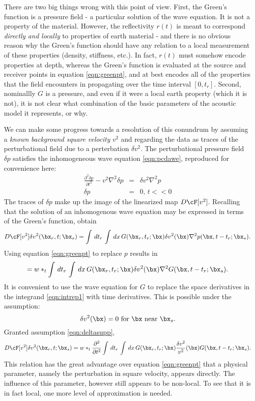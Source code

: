 There are two big things wrong with this point of view. First, the Green's function is a pressure field - a particular solution of the wave equation. It is not a property of the material. However, the reflectivity $r(t)$ is meant to correspond {\em directly and locally}  to properties of earth material - and there is no obvious reason why the Green's function should have any relation to a local measurement of these properties (density, stiffness, etc.). In fact, $r(t)$ must somehow encode properties at depth, whereas the Green's function is evaluated at the source and receiver points in equation \ref{eqn:greenpt}, and at best encodes all of the properties that the field encounters in propagating over the time interval $[0,t_r]$. Second, nominallly $G$ is a pressure, and even if it were a local earth property (which it is not), it is not clear what combination of the basic parameters of the acoustic model it represents, or why.

We can make some progress towards a resolution of this conundrum by assuming a {\em known background square velocity $v^2$} and regarding the data as traces of the perturbational field due to a perterbation $\delta v^2$. The perturbational pressure field $\delta p$ satisfies the inhomogeneous wave equation \ref{eqn:pcdawe}, reproduced for convenience here:
\begin{eqnarray}
\label{eqn:pcdaweconv}
\frac{\partial^2 \delta p}{\partial t^2} -v^2 \nabla^2 \delta p& = & \delta v^2 \nabla^2 p\\
\delta p &= & 0, \,t<<0 \nonumber 
\end{eqnarray} 
The traces of $\delta p$ make up the image of the linearized map $D\cF[v^2]$. Recalling that the solution of an inhomogenous wave equation may be expressed in terms of the Green's function, obtain
\[
D\cF[v^2]\delta v^2(\bx_r,t;\bx_s) = \int \, dt_r \, \int \,dx\, G(\bx_r,t_r;\bx) \delta v^2(\bx) \nabla^2 p(\bx,t-t_r;\bx_s).
\]
Using equation \ref{eqn:greenpt} to replace $p$ results in
\begin{eqnarray}
\label{eqn:intrep1}
= w *_t \int \,dt_r\, \int \, dx \, G(\bx_r,t_r;\bx)\delta v^2(\bx) \nabla^2 G(\bx,t-t_r;\bx_s).
\end{eqnarray}
It is convenient to use the wave equation for $G$ to replace the space derivatives in the integrand \ref{eqn:intrep1} with time derivatives. This is possible under the assumption:
\begin{equation}
\label{eqn:deltasupp}
\delta v^2(\bx) = 0 \mbox{ for } \bx \mbox{ near } \bx_s.
\end{equation}
Granted assumption \ref{eqn:deltasupp}, 
\begin{equation}
\label{eqn:intrep}
D\cF[v^2]\delta v^2(\bx_r,t;\bx_s) = w *_t \frac{\partial^2}{\partial t^2}\int \,dt_r\, \int \, dx \, G(\bx_r,t_r;\bx)\frac{\delta v^2}{v^2}(\bx) G(\bx,t-t_r;\bx_s).
\end{equation}
This relation has the great advantage over equation \ref{eqn:greenpt} that a physical parameter, namely the perturbation in square velocity, appears directly. The influence of this parameter, however still appears to be non-local. To see that it is in fact local, one more level of approximation is needed.

